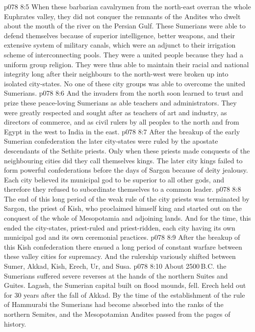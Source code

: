 \vs p078 8:5 When these barbarian cavalrymen from the north\hyp{}east overran the whole Euphrates valley, they did not conquer the remnants of the Andites who dwelt about the mouth of the river on the Persian Gulf. These Sumerians were able to defend themselves because of superior intelligence, better weapons, and their extensive system of military canals, which were an adjunct to their irrigation scheme of interconnecting pools. They were a united people because they had a uniform group religion. They were thus able to maintain their racial and national integrity long after their neighbours to the north\hyp{}west were broken up into isolated city\hyp{}states. No one of these city groups was able to overcome the united Sumerians.
\vs p078 8:6 And the invaders from the north soon learned to trust and prize these peace\hyp{}loving Sumerians as able teachers and administrators. They were greatly respected and sought after as teachers of art and industry, as directors of commerce, and as civil rulers by all peoples to the north and from Egypt in the west to India in the east.
\vs p078 8:7 After the breakup of the early Sumerian confederation the later city\hyp{}states were ruled by the apostate descendants of the Sethite priests. Only when these priests made conquests of the neighbouring cities did they call themselves kings. The later city kings failed to form powerful confederations before the days of Sargon because of deity jealousy. Each city believed its municipal god to be superior to all other gods, and therefore they refused to subordinate themselves to a common leader.
\vs p078 8:8 The end of this long period of the weak rule of the city priests was terminated by Sargon, the priest of Kish, who proclaimed himself king and started out on the conquest of the whole of Mesopotamia and adjoining lands. And for the time, this ended the city\hyp{}states, priest\hyp{}ruled and priest\hyp{}ridden, each city having its own municipal god and its own ceremonial practices.
\vs p078 8:9 After the breakup of this Kish confederation there ensued a long period of constant warfare between these valley cities for supremacy. And the rulership variously shifted between Sumer, Akkad, Kish, Erech, Ur, and Susa.
\vs p078 8:10 About 2500\,B.C. the Sumerians suffered severe reverses at the hands of the northern Suites and Guites. Lagash, the Sumerian capital built on flood mounds, fell. Erech held out for 30 years after the fall of Akkad. By the time of the establishment of the rule of Hammurabi the Sumerians had become absorbed into the ranks of the northern Semites, and the Mesopotamian Andites passed from the pages of history.
